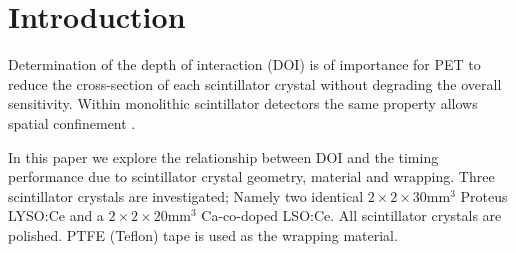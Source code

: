 \section{Introduction} 
Determination of the depth of interaction (DOI) is of importance for PET to reduce the cross-section of each scintillator crystal without degrading the overall sensitivity\cite{Moses_2001}\cite{Humm_Rosenfeld_Del_Guerra_2003}. Within monolithic scintillator detectors the same property allows spatial confinement \cite{am_Borghi_Seifert_Schaart_2013}\cite{Maas_Bruyndonckx_Schaart_2012}.

In this paper we explore the relationship between DOI and the timing performance due to scintillator crystal geometry, material and wrapping. Three scintillator crystals are investigated; Namely two identical $2\times2\times30$mm$^3$ Proteus LYSO:Ce and a $2\times2\times20$mm$^3$ Ca-co-doped LSO:Ce. All scintillator crystals are polished. PTFE (Teflon) tape is used as the wrapping material.
